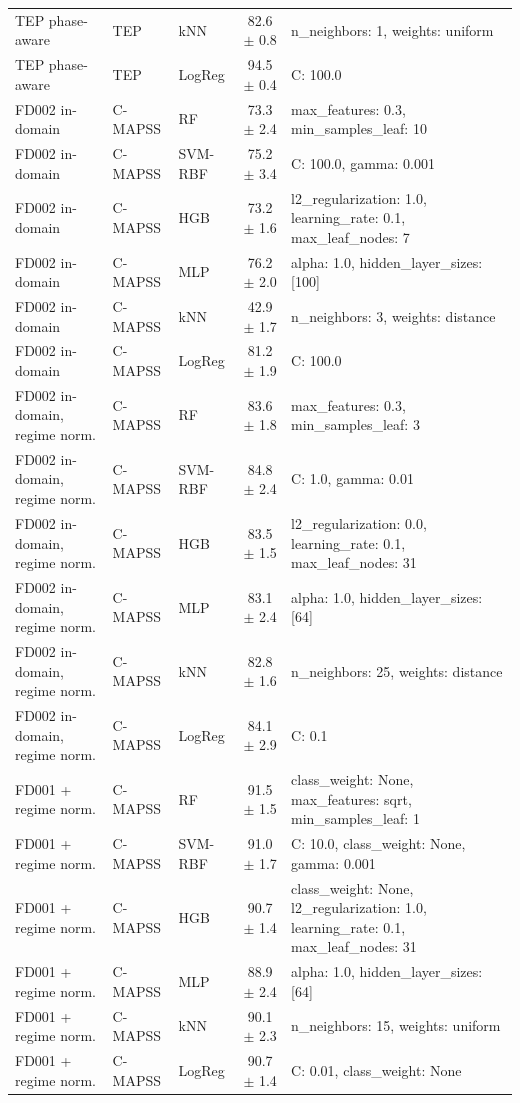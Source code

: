 \begin{table}[htbp]
{\begin{tabular}{@{}lllcl@{}}
TEP phase-aware & TEP & kNN & 82.6 $\pm$ 0.8 & n\_neighbors: 1, weights: uniform \\
TEP phase-aware & TEP & LogReg & 94.5 $\pm$ 0.4 & C: 100.0 \\
FD002 in-domain & C-MAPSS & RF & 73.3 $\pm$ 2.4 & max\_features: 0.3, min\_samples\_leaf: 10 \\
FD002 in-domain & C-MAPSS & SVM-RBF & 75.2 $\pm$ 3.4 & C: 100.0, gamma: 0.001 \\
FD002 in-domain & C-MAPSS & HGB & 73.2 $\pm$ 1.6 & l2\_regularization: 1.0, learning\_rate: 0.1, max\_leaf\_nodes: 7 \\
FD002 in-domain & C-MAPSS & MLP & 76.2 $\pm$ 2.0 & alpha: 1.0, hidden\_layer\_sizes: [100] \\
FD002 in-domain & C-MAPSS & kNN & 42.9 $\pm$ 1.7 & n\_neighbors: 3, weights: distance \\
FD002 in-domain & C-MAPSS & LogReg & 81.2 $\pm$ 1.9 & C: 100.0 \\
FD002 in-domain, regime norm. & C-MAPSS & RF & 83.6 $\pm$ 1.8 & max\_features: 0.3, min\_samples\_leaf: 3 \\
FD002 in-domain, regime norm. & C-MAPSS & SVM-RBF & 84.8 $\pm$ 2.4 & C: 1.0, gamma: 0.01 \\
FD002 in-domain, regime norm. & C-MAPSS & HGB & 83.5 $\pm$ 1.5 & l2\_regularization: 0.0, learning\_rate: 0.1, max\_leaf\_nodes: 31 \\
FD002 in-domain, regime norm. & C-MAPSS & MLP & 83.1 $\pm$ 2.4 & alpha: 1.0, hidden\_layer\_sizes: [64] \\
FD002 in-domain, regime norm. & C-MAPSS & kNN & 82.8 $\pm$ 1.6 & n\_neighbors: 25, weights: distance \\
FD002 in-domain, regime norm. & C-MAPSS & LogReg & 84.1 $\pm$ 2.9 & C: 0.1 \\
FD001 + regime norm. & C-MAPSS & RF & 91.5 $\pm$ 1.5 & class\_weight: None, max\_features: sqrt, min\_samples\_leaf: 1 \\
FD001 + regime norm. & C-MAPSS & SVM-RBF & 91.0 $\pm$ 1.7 & C: 10.0, class\_weight: None, gamma: 0.001 \\
FD001 + regime norm. & C-MAPSS & HGB & 90.7 $\pm$ 1.4 & class\_weight: None, l2\_regularization: 1.0, learning\_rate: 0.1, max\_leaf\_nodes: 31 \\
FD001 + regime norm. & C-MAPSS & MLP & 88.9 $\pm$ 2.4 & alpha: 1.0, hidden\_layer\_sizes: [64] \\
FD001 + regime norm. & C-MAPSS & kNN & 90.1 $\pm$ 2.3 & n\_neighbors: 15, weights: uniform \\
FD001 + regime norm. & C-MAPSS & LogReg & 90.7 $\pm$ 1.4 & C: 0.01, class\_weight: None \\
\bottomrule\end{tabular}}\end{table}
